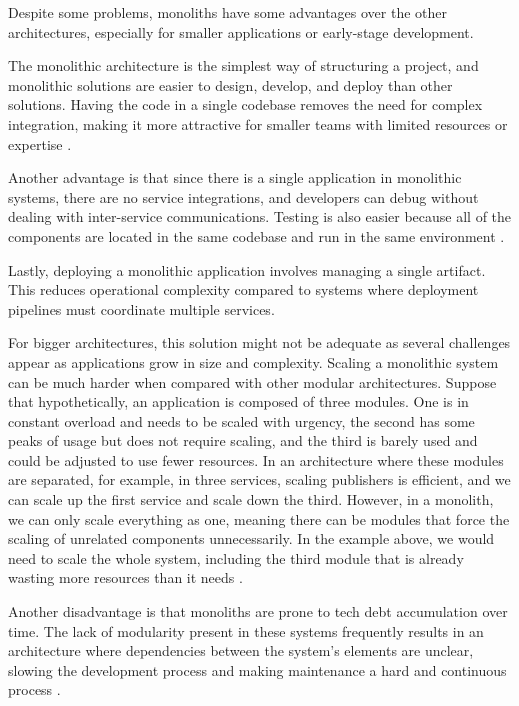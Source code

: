 Despite some problems, monoliths have some advantages over the other architectures,
especially for smaller applications or early-stage development.

The monolithic architecture is the simplest way of structuring a
project, and monolithic solutions are easier to design, develop, and deploy
than other solutions.
Having the code in a single codebase removes the need for complex
integration, making it more attractive for smaller teams with limited
resources or expertise \cite{IBMMonolith}.

Another advantage is that since there is a single application in monolithic
systems, there are no service integrations, and developers can debug without
dealing with inter-service communications. Testing is also easier because all
of the components are located in the same codebase and run in the same
environment \cite{newman2019monolith}.

Lastly, deploying a monolithic application involves managing a single artifact. This
reduces operational complexity compared to systems where deployment
pipelines must coordinate multiple services.

For bigger architectures, this solution might not be adequate as several
challenges appear as applications grow in size and complexity.
Scaling a monolithic system can be much harder when
compared with other modular architectures. Suppose that hypothetically,
an application is composed of three modules. One is in constant
overload and needs to be scaled with urgency, the second has some peaks of
usage but does not require scaling, and the third is barely used and
could be adjusted to use fewer resources. In an architecture where these
modules are separated, for example, in three services, scaling publishers is
efficient, and we can scale up the first service and scale down the third.
However, in a monolith, we can only scale everything as one, meaning there
can be modules that force the scaling of unrelated components unnecessarily.
In the example above, we would need to scale the whole system, including
the third module that is already wasting more resources than it needs \cite{7333476}.

Another disadvantage is that monoliths are prone to tech debt accumulation over
time. The lack of modularity present in these systems frequently results in
an architecture where dependencies between the system's elements are unclear,
slowing the development process and making maintenance a hard and continuous
process \cite{7333476}.

